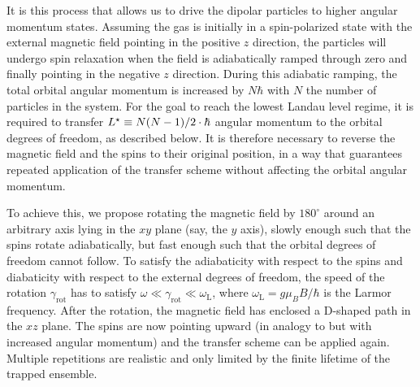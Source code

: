 It is this process that allows us to drive the dipolar particles to higher angular momentum states. Assuming the gas is initially in a spin-polarized state with the external magnetic field pointing in the positive $z$ direction, the particles will undergo spin relaxation when the field is adiabatically ramped through zero and finally pointing in the negative $z$ direction. During this adiabatic ramping,
the total orbital angular momentum is increased by $N\hbar$ with $N$ the number of particles in the system.  For the goal to reach the lowest Landau level regime, it is required to transfer  $L^{\star}\equiv N(N-1)/2 \cdot \hbar$ angular momentum to the orbital degrees of freedom, as described below. It is therefore necessary to reverse the magnetic field and the spins to their original position, in a way that guarantees repeated application of the transfer scheme without affecting the orbital angular momentum.

To achieve this, we propose rotating the magnetic field by $180^\circ$ around an arbitrary axis lying in the $xy$ plane (say, the $y$ axis), slowly enough such that the spins rotate adiabatically, but fast enough such that the orbital degrees of freedom cannot follow. To satisfy the adiabaticity with respect to the spins and diabaticity with respect to the external degrees of freedom, the speed of the rotation $\gamma_\text{rot}$ has to satisfy
$\omega \ll \gamma_\text{rot} \ll \omega_\text{L}$, where $\omega_\text{L}=g\mu_B B/\hbar$ is the Larmor frequency. After the rotation, the magnetic field has enclosed a \textsf{D}-shaped path in the $xz$ plane. The spins are now pointing upward (in analogy to  but with
increased angular momentum) and the transfer scheme can be applied again. Multiple repetitions are realistic and only limited by the finite lifetime of the trapped ensemble.

